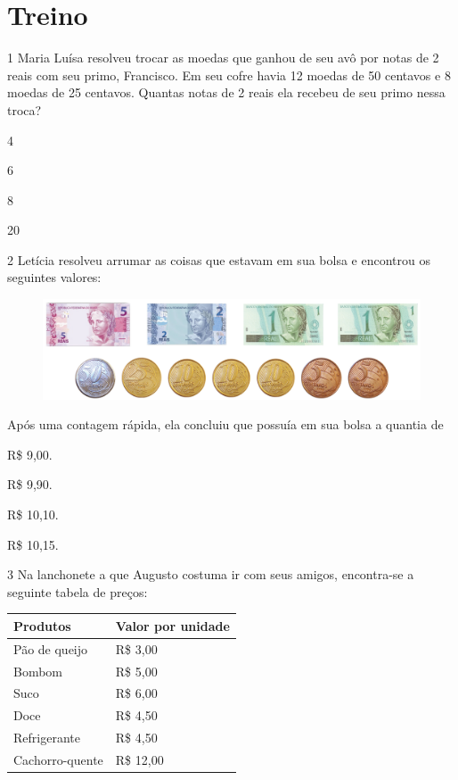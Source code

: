 \section*{Treino}

\num{1} Maria Luísa resolveu trocar as moedas que ganhou de seu avô por
notas de 2 reais com seu primo, Francisco. Em seu cofre havia 12 moedas de 50 centavos e 8 moedas de 25 centavos. Quantas notas de 2
reais ela recebeu de seu primo nessa troca?

\begin{escolha}
\item
  4
\item
  6
\item
  8
\item
  20
\end{escolha}


\pagebreak

\num{2} Letícia resolveu arrumar as coisas que estavam em sua bolsa e
encontrou os seguintes valores:

\begin{figure}[htpb!]
\includegraphics[width=\textwidth]{../ilustracoes/MAT5/SAEB_5ANO_MAT_figura56.png}
\end{figure}

Após uma contagem rápida, ela concluiu que possuía em sua bolsa a quantia de

\begin{escolha}
\item
  R\$ 9,00.
\item
  R\$ 9,90.
\item
  R\$ 10,10.
\item
  R\$ 10,15.
\end{escolha}


\num{3} Na lanchonete a que Augusto costuma ir com seus amigos, encontra-se a
seguinte tabela de preços:

\begin{longtable}[]{@{}ll@{}}
\toprule
Produtos & Valor por unidade\tabularnewline
\midrule
\endhead
Pão de queijo & R\$ 3,00\tabularnewline
Bombom & R\$ 5,00\tabularnewline
Suco & R\$ 6,00\tabularnewline
Doce & R\$ 4,50\tabularnewline
Refrigerante & R\$ 4,50\tabularnewline
Cachorro-quente & R\$ 12,00\tabularnewline
\bottomrule
\end{longtable}


